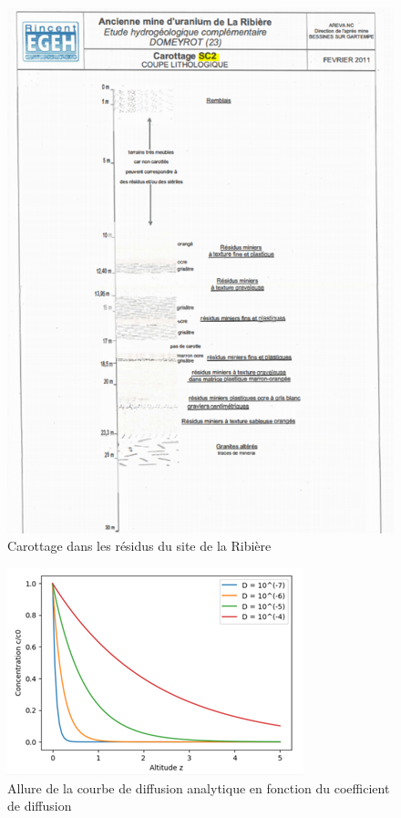 \documentclass{article}
\begin{document}
\begin{figure}[H]
    \centering
    \includegraphics[width = \textwidth]{III_C_1.png}
    \caption{Carottage dans les résidus du site de la Ribière}
    \label{fig:carottage_residus}
\end{figure}

\begin{figure}[H]
    \centering
    \includegraphics[height = 0.4 \textheight]{III_C_8.png}
    \caption{Allure de la courbe de diffusion analytique en fonction du coefficient de diffusion}
    \label{fig:sens_diffusion}
\end{figure}
\end{document}
